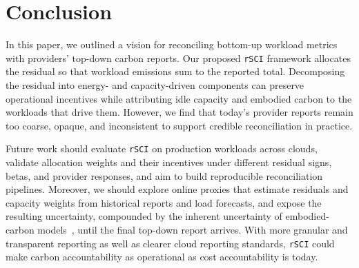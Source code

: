 \documentclass[sigconf]{acmart}
\newcommand{\RSCI}{\texttt{rSCI}\xspace}
\begin{document}
\section{Conclusion}
\label{sec:future}

In this paper, we outlined a vision for reconciling bottom-up workload metrics with providers' top-down carbon reports.
Our proposed \RSCI framework allocates the residual so that workload emissions sum to the reported total.
Decomposing the residual into energy- and capacity-driven components can preserve operational incentives while attributing idle capacity and embodied carbon to the workloads that drive them.
However, we find that today's provider reports remain too coarse, opaque, and inconsistent to support credible reconciliation in practice.

Future work should evaluate \RSCI on production workloads across clouds, validate allocation weights and their incentives under different residual signs, betas, and provider responses, and aim to build reproducible reconciliation pipelines.
Moreover, we should explore online proxies that estimate residuals and capacity weights from historical reports and load forecasts, and expose the resulting uncertainty, compounded by the inherent uncertainty of embodied-carbon models~\cite{bhagavathula2024uncertainty}, until the final top-down report arrives.
With more granular and transparent reporting as well as clearer cloud reporting standards, \RSCI could make carbon accountability as operational as cost accountability is today.




\end{document}
